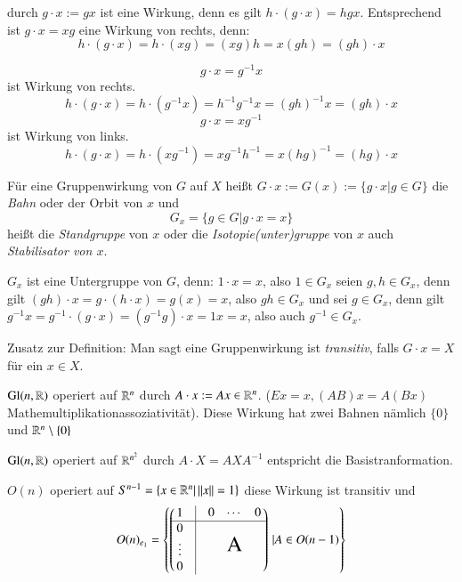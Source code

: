\documentclass[a4paper,10pt]{scrartcl}
\begin{document}
\begin{exs*}[$G=X$]
 durch $g\cdot x:= gx$ ist eine Wirkung, denn es gilt $h\cdot (g\cdot x)=hgx$. Entsprechend ist $g\cdot x=xg$ eine Wirkung von rechts, denn:
\[
 h\cdot(g\cdot x)=h\cdot (xg)=(xg)h=x(gh)=(gh)\cdot x
\]

\[
 g\cdot x=g^{-1}x
\]
ist Wirkung von rechts.
\[
 h\cdot (g\cdot x)=h\cdot(g^{-1}x)=h^{-1}g^{-1}x=(gh)^{-1}x=(gh)\cdot x
\]
\[
 g\cdot x=xg^{-1}
\]
ist Wirkung von links.
\[
 h\cdot(g\cdot x)=h\cdot(xg^{-1})=xg^{-1}h^{-1}=x(hg)^{-1}=(hg)\cdot x
\]
\end{exs*}
\begin{df}\label{thm2:3.3}
 Für eine Gruppenwirkung von $G$ auf $X$ heißt $G\cdot x:=G(x):=\{g\cdot x|g\in G\}$ die \emph{Bahn} oder der Orbit von $x$ und
\[
 G_x=\{g\in G|g\cdot x = x\}
\]
heißt die \emph{Standgruppe} von $x$ oder die \emph{Isotopie(unter)gruppe} von $x$ auch \emph{Stabilisator von $x$}.
\end{df}
\begin{note*}
 $G_x$ ist eine Untergruppe von $G$, denn: $1\cdot x=x$, also $1\in G_x$ seien $g,h \in G_x$, denn gilt $(gh)\cdot x=g\cdot(h\cdot x)=g(x)=x$, also $gh\in G_x$ und sei $g\in G_x$, denn gilt $g^{-1}x=g^{-1}\cdot (g\cdot x)=(g^{-1}g)\cdot x=1x=x$, also auch $g^{-1}\in G_x$.
\end{note*}
\begin{seg}{Zusatz zur Definition:}
 Man sagt eine Gruppenwirkung ist \emph{transitiv}, falls $G\cdot x= X$ für ein $x\in X$.
\end{seg}
\begin{ex*}
 \item $\text{Gl}(n, \mathbb{R})$ operiert auf $\mathbb{R}^n$ durch $A\cdot x:= Ax\in \mathbb{R}^n$. ($Ex=x, (AB)x=A(Bx)$ Mathemultiplikationassoziativität). Diese Wirkung hat zwei Bahnen nämlich $\{0\}$ und $\mathbb{R}^n\setminus\{0\}$
 \item $\text{Gl}(n, \mathbb{R})$ operiert auf $\mathbb{R}^{n^2}$ durch $A\cdot X=AXA^{-1}$ entspricht die Basistranformation.
 \item $O(n)$ operiert auf $S^{n-1}=\{x\in \mathbb{R}^n|\,||x||=1\}$ diese Wirkung ist transitiv und
\[
 O(n)_{e_1}=\left \{ \left ( \, \begin{matrix} 1 & \vline & \begin{matrix} 0 & \cdots & 0 \end{matrix}\\ \hline \begin{matrix} 0 \\ \vdots \\ 0\end{matrix}& \vline & \text{\LARGE{A}} \end{matrix}\, \right ) \, | A \in O(n-1)\right \}
\] 
\end{ex*}
\end{document}
